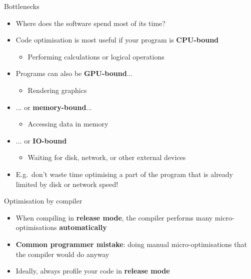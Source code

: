 \begin{frame}{Bottlenecks}
	\begin{itemize}
		\item Where does the software spend most of its time? \pause
		\item Code optimisation is most useful if your program is \textbf{CPU-bound}
			\begin{itemize}
				\item Performing calculations or logical operations \pause
			\end{itemize}
		\item Programs can also be \textbf{GPU-bound}...
			\begin{itemize}
				\item Rendering graphics \pause
			\end{itemize}
		\item ... or \textbf{memory-bound}...
			\begin{itemize}
				\item Accessing data in memory \pause
			\end{itemize}
		\item ... or \textbf{IO-bound}
			\begin{itemize}
				\item Waiting for disk, network, or other external devices \pause
			\end{itemize}
		\item E.g.\ don't waste time optimising a part of the program that is already limited by
			disk or network speed!
	\end{itemize}
\end{frame}

\begin{frame}{Optimisation by compiler}
	\begin{itemize}
		\item When compiling in \textbf{release mode}, the compiler performs many
			micro-optimisations \textbf{automatically} \pause
		\item \textbf{Common programmer mistake}: doing manual micro-optimisations that the compiler would do anyway \pause
		\item Ideally, always profile your code in \textbf{release mode}
	\end{itemize}
\end{frame}
